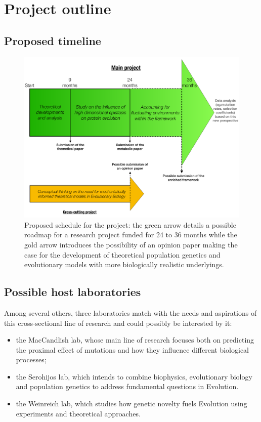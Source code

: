 \documentclass[11pt,onecolumn]{article}
\begin{document}
\pagebreak

\section{Project outline}

\subsection{Proposed timeline}

\begin{figure}[h!]
    \centering
    \includegraphics[scale=0.45,trim=0cm 0cm 0cm 0.5cm,clip]{Chronological-PostDoc.pdf}
    \caption{Proposed schedule for the project: the green arrow details a possible roadmap for a research project funded for 24 to 36 months while the gold arrow introduces the possibility of an opinion paper making the case for the development of theoretical population genetics and evolutionary models with more biologically realistic underlyings.}
    \label{fig:ChronologicalTiming}
\end{figure}

\subsection{Possible host laboratories}

Among several others, three laboratories match with the needs and aspirations of this cross-sectional line of research and could possibly be interested by it:
\begin{itemize}
    \item the MacCandlish lab, whose main line of research focuses both on predicting the proximal effect of mutations and how they influence different biological processes;
    \item the Serohijos lab, which intends to combine biophysics, evolutionary biology and population genetics to address fundamental questions in Evolution.
    \item the Weinreich lab, which studies how genetic novelty fuels Evolution using experiments and theoretical approaches.
\end{itemize}
\end{document}
